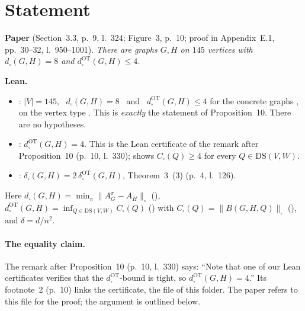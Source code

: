 

\paperversion

\section{Statement}
\textbf{Paper} (Section~3.3, p.~9, l.~324; Figure~3, p.~10; proof in Appendix~E.1, pp.~30--32, l.~950--1001).
\emph{There are graphs $G,H$ on $145$ vertices with $d_\square(G,H)=8$ and $d^{\mathrm{OT}}_\square(G,H)\le4$.}

\textbf{Lean.}
\begin{itemize}
\item {}: \quad $|V| = 145$, \ $d_\square(G,H) = 8$ \ and \ $d^{\mathrm{OT}}_\square(G,H) \le 4$
for the concrete graphs ,  on the vertex type . This is \emph{exactly} the statement of
Proposition~10. There are no hypotheses.
\item {}: \quad $d^{\mathrm{OT}}_\square(G,H)=4$. This is the Lean certificate of the
remark after Proposition~10 (p.~10, l.~330);  shows $C_\square(Q)\ge4$ for every
$Q\in\mathrm{DS}(V,W)$.
\item {}: \quad $\delta_\square(G,H)=2\,\delta^{\mathrm{OT}}_\square(G,H)$, Theorem~3~(3)
(p.~4, l.~126).
\end{itemize}
Here $d_\square(G,H)=\min_\pi\|A^\pi_G-A_H\|_\square$ (), $d^{\mathrm{OT}}_\square(G,H)=\inf_{Q\in\mathrm{DS}(V,W)}C_\square(Q)$
() with $C_\square(Q)=\|B(G,H,Q)\|_\square$ (), and $\delta=d/n^2$.

\paragraph{The equality claim.} The remark after Proposition~10 (p.~10, l.~330) says: ``Note that one of our Lean
certificates verifies that the $d^{\mathrm{OT}}_\square$-bound is tight, so $d^{\mathrm{OT}}_\square(G,H)=4$.'' Its
footnote~2 (p.~10) links the certificate, the file  of
this folder. The paper refers to this file for the proof; the argument is outlined below.

